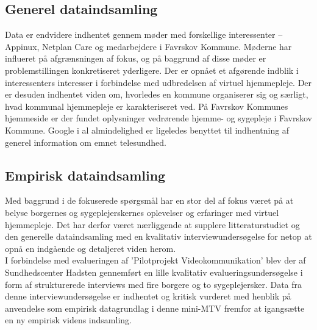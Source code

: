 \subsection{Generel dataindsamling}
Data er endvidere indhentet gennem møder med forskellige interessenter – Appinux, Netplan Care og medarbejdere i Favrskov Kommune. Møderne har influeret på afgrænsningen af fokus, og på baggrund af disse møder er problemstillingen konkretiseret yderligere. Der er opnået et afgørende indblik i interessenters interesser i forbindelse med udbredelsen af virtuel hjemmepleje. Der er desuden indhentet viden om, hvorledes en kommune organiserer sig og særligt, hvad kommunal hjemmepleje er karakteriseret ved. På Favrskov Kommunes hjemmeside er der fundet oplysninger vedrørende hjemme- og sygepleje i Favrskov Kommune. Google i al almindelighed er ligeledes benyttet til indhentning af generel information om emnet telesundhed.

\subsection{Empirisk dataindsamling}
Med baggrund i de fokuserede spørgsmål har en stor del af fokus været på at belyse borgernes og sygeplejerskernes oplevelser og erfaringer med virtuel hjemmepleje. Det har derfor været nærliggende at supplere litteraturstudiet og den generelle dataindsamling med en kvalitativ interviewundersøgelse for netop at opnå en indgående og detaljeret viden herom.\\
I forbindelse med evalueringen af ’Pilotprojekt Videokommunikation’ blev der af Sundhedscenter Hadsten gennemført en lille kvalitativ evalueringsundersøgelse i form af strukturerede interviews med fire borgere og to sygeplejersker. Data fra denne interviewundersøgelse er indhentet og kritisk vurderet med henblik på anvendelse som empirisk datagrundlag i denne mini-MTV fremfor at igangsætte en ny empirisk videns indsamling.
